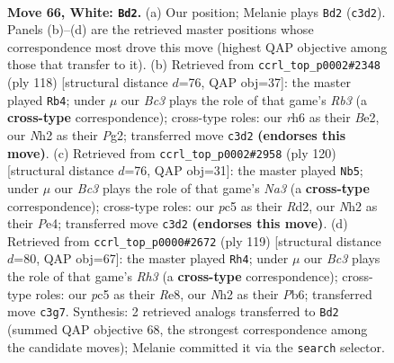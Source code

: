 \documentclass[11pt]{article}
\begin{document}
\clearpage

\begin{figure}[p]\centering
\begin{subfigure}{0.46\textwidth}\centering
\resizebox{\linewidth}{!}{%
\newchessgame
\chessboard[
  setfen={4r1k1/6p1/p2b3r/Pppb1p1p/2p2P1P/2B1P1P1/1P2K2N/1R4R1 w - - 4 66},
  showmover=false,
  pgfstyle=straightmove, color=movearrow, markmove={c3-d2}
]}
\caption{}
\end{subfigure}\hfill
\begin{subfigure}{0.46\textwidth}\centering
\resizebox{\linewidth}{!}{%
\newchessgame
\chessboard[
  setfen={r2k4/rpb5/4p3/2Pp1pp1/P2P3p/KR2P2P/4B1P1/3R4 w - - 8 60},
  showmover=false,
  pgfstyle=straightmove, color=movearrow, markmove={b3-b4}
]}
\caption{}
\end{subfigure}
\\[4pt]
\begin{subfigure}{0.46\textwidth}\centering
\resizebox{\linewidth}{!}{%
\newchessgame
\chessboard[
  setfen={1r2n3/4b3/2r1kp2/2p1p1p1/p1K1P2p/N1B2P1P/PP1R2P1/1R6 w - - 15 61},
  showmover=false,
  pgfstyle=straightmove, color=movearrow, markmove={a3-b5}
]}
\caption{}
\end{subfigure}\hfill
\begin{subfigure}{0.46\textwidth}\centering
\resizebox{\linewidth}{!}{%
\newchessgame
\chessboard[
  setfen={4r3/2pbpk2/1p1p3r/pP1P1Pp1/2P3P1/P3R1K1/6B1/4R3 b - - 6 60},
  showmover=false,
  pgfstyle=straightmove, color=movearrow, markmove={h6-h4}
]}
\caption{}
\end{subfigure}
\caption{\textbf{Move 66, White: \texttt{Bd2}.} (a) Our position; Melanie plays \texttt{Bd2} (\texttt{c3d2}). Panels (b)--(d) are the retrieved master positions whose correspondence most drove this move (highest QAP objective among those that transfer to it). (b) Retrieved from \texttt{ccrl\_top\_p0002\#2348} (ply 118) [structural distance $d$=76, QAP obj=37]: the master played \texttt{Rb4}; under $\mu$ our \emph{Bc3} plays the role of that game's \emph{Rb3} (a \textbf{cross-type} correspondence); cross-type roles: our \emph{r}h6 as their \emph{B}e2, our \emph{N}h2 as their \emph{P}g2; transferred move \texttt{c3d2} \textbf{(endorses this move)}. (c) Retrieved from \texttt{ccrl\_top\_p0002\#2958} (ply 120) [structural distance $d$=76, QAP obj=31]: the master played \texttt{Nb5}; under $\mu$ our \emph{Bc3} plays the role of that game's \emph{Na3} (a \textbf{cross-type} correspondence); cross-type roles: our \emph{p}c5 as their \emph{R}d2, our \emph{N}h2 as their \emph{P}e4; transferred move \texttt{c3d2} \textbf{(endorses this move)}. (d) Retrieved from \texttt{ccrl\_top\_p0000\#2672} (ply 119) [structural distance $d$=80, QAP obj=67]: the master played \texttt{Rh4}; under $\mu$ our \emph{Bc3} plays the role of that game's \emph{Rh3} (a \textbf{cross-type} correspondence); cross-type roles: our \emph{p}c5 as their \emph{R}e8, our \emph{N}h2 as their \emph{P}b6; transferred move \texttt{c3g7}. Synthesis: 2 retrieved analogs transferred to \texttt{Bd2} (summed QAP objective 68, the strongest correspondence among the candidate moves); Melanie committed it via the \texttt{search} selector.}
\label{fig:thought-m130}
\end{figure}
\end{document}
